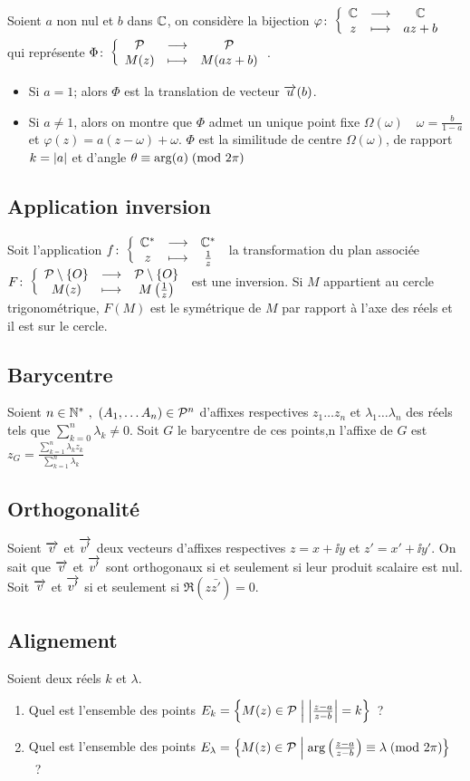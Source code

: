 %
Soient \(a\) non nul et \(b\) dans \(\mathbb{C}\), on considère la bijection \(\varphi\colon \left\{\begin{array}{ccc} \mathbb{C} & \longrightarrow &\mathbb{C}\\ z & \longmapsto & az+b \end{array} \right.\) qui représente \(\Phi\colon \left\{\begin{array}{ccc} \mathcal{P} & \longrightarrow &\mathcal{P}\\ M(z) & \longmapsto & M(az+b) \end{array} \right.\).
\begin{itemize}
\item Si \(a=1\); alors  \(\Phi\) est la translation de vecteur \(\overrightarrow{u}(b)\).
\item Si \(a \neq 1\), alors on montre que \(\Phi\) admet un unique point fixe \(\Omega(\omega) \quad \omega = \frac{b}{1-a}\) et \(\varphi(z)=a(z-\omega)+\omega\).
  \(\Phi\) est la similitude de centre \(\Omega(\omega)\), de rapport \(k=\left\lvert a\right\rvert\) et d'angle \(\theta \equiv \arg(a)\!\pmod {2\pi}\)
\end{itemize}
%
\subsection{Application inversion}
\label{subsec:appinverse}
Soit l'application \(f\colon \left\{\begin{array}{ccc} \mathbb{C}^* & \longrightarrow &\mathbb{C}^*\\ z & \longmapsto & \frac{1}{z} \end{array} \right.\) la transformation du plan associée \(F\colon \left\{\begin{array}{ccc} \mathcal{P} \setminus\{O\} & \longrightarrow &\mathcal{P} \setminus\{O\}\\ M(z) & \longmapsto & M \left( \frac{1}{z} \right) \end{array} \right.\) est une inversion. Si \(M\) appartient au cercle trigonométrique, \(F(M)\) est le symétrique de \(M\) par rapport à l'axe des réels et il est sur le cercle.
%
\subsection{Barycentre}
\label{subsec:complexebarycentre}
Soient \(n \in \mathbb{N}^{*} \ , \ (A_1, \ldots A_n) \in \mathcal{P}^n\)  d'affixes respectives \(z_1 \ldots z_n\) et \(\lambda_1 \ldots \lambda_n\) des réels tels que \(\sum_{k=0}^{n} \lambda_k \neq 0\). Soit \(G\) le barycentre de ces points,n l'affixe de \(G\) est \(z_G=\frac{\sum_{k=1}^{n}\lambda_k z_k}{\sum_{k=1}^{n}\lambda_k}\)
%
\subsection{Orthogonalité}
\label{subsec:complexeorthogonalite}
Soient \(\overrightarrow{v}\) et \(\overrightarrow{v'}\) deux vecteurs d'affixes respectives \(z=x+\ii y\) et \(z'=x'+\ii y'\). On sait que \(\overrightarrow{v}\) et \(\overrightarrow{v'}\) sont orthogonaux si et seulement si leur produit scalaire est nul. Soit \(\overrightarrow{v}\) et \(\overrightarrow{v'}\) si et seulement si \(\Re(z \bar{z'})=0\).
%
\subsection{Alignement}
\label{subsec:complexealignement}
Soient deux réels \(k\) et \(\lambda\).
\begin{enumerate}
\item Quel est l'ensemble des points \(E_k = \left\{M(z) \in \mathcal{P}\mathrel{}\middle|\mathrel{}\left\lvert\frac{z-a}{z-b}\right\rvert=k\right\}\)~?
\item Quel est l'ensemble des points \(E_\lambda = \left\{M(z) \in \mathcal{P}\mathrel{}\middle|\mathrel{}\arg \left(\frac{z-a}{z-b} \right) \equiv \lambda\!\pmod {2\pi}\right\}\)~?
\end{enumerate}

